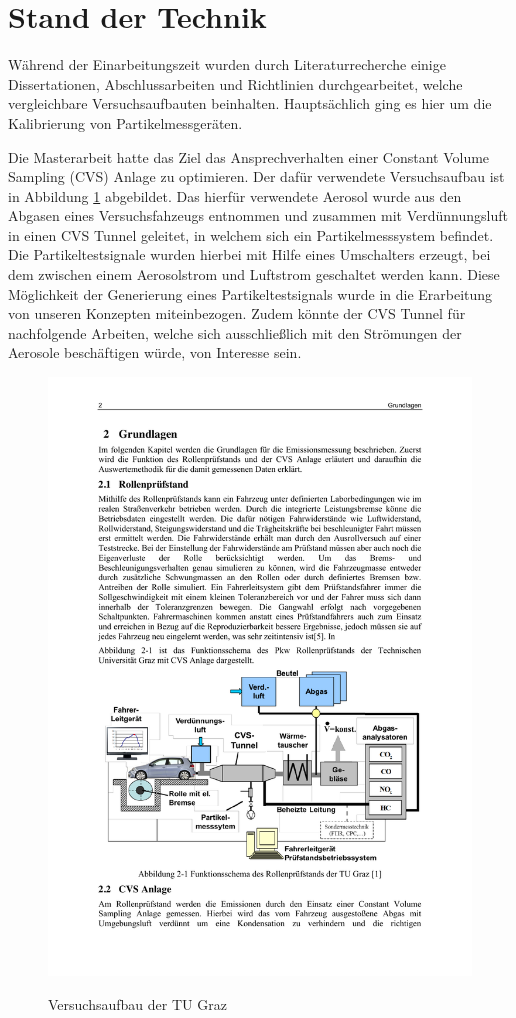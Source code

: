 \section{Stand der Technik}
W\"{a}hrend der Einarbeitungszeit wurden durch Literaturrecherche einige Dissertationen, Abschlussarbeiten und Richtlinien durchgearbeitet, welche vergleichbare Versuchsaufbauten beinhalten. Haupts\"{a}chlich ging es hier um die Kalibrierung von Partikelmessger\"{a}ten.

Die Masterarbeit \cite{auswertemethodik} hatte das Ziel das Ansprechverhalten einer Constant Volume Sampling (CVS) Anlage zu optimieren. Der daf\"{u}r verwendete Versuchsaufbau ist in Abbildung \ref{fig:aufbau_graz} abgebildet. Das hierf\"{u}r verwendete Aerosol wurde aus den Abgasen eines Versuchsfahzeugs entnommen und zusammen mit Verd\"{u}nnungsluft in einen CVS Tunnel geleitet, in welchem sich ein Partikelmesssystem befindet. Die Partikeltestsignale wurden hierbei mit Hilfe eines Umschalters erzeugt, bei dem zwischen einem Aerosolstrom und Luftstrom geschaltet werden kann. Diese M\"{o}glichkeit der Generierung eines Partikeltestsignals wurde in die Erarbeitung von unseren Konzepten miteinbezogen. Zudem k\"{o}nnte der CVS Tunnel f\"{u}r nachfolgende Arbeiten, welche sich ausschlie{\ss}lich mit den Str\"{o}mungen der Aerosole besch\"{a}ftigen w\"{u}rde, von Interesse sein.

\begin{figure}[H]
	\myfloatalign
	{\includegraphics[width=.6\linewidth]{gfx/related/graz_versuch.pdf}} \quad
	\caption[Versuchsaufbau der TU Graz (Quelle: \cite{auswertemethodik}, S.2)]
	{Versuchsaufbau der TU Graz\cite{auswertemethodik}}
	\label{fig:aufbau_graz}
\end{figure}

